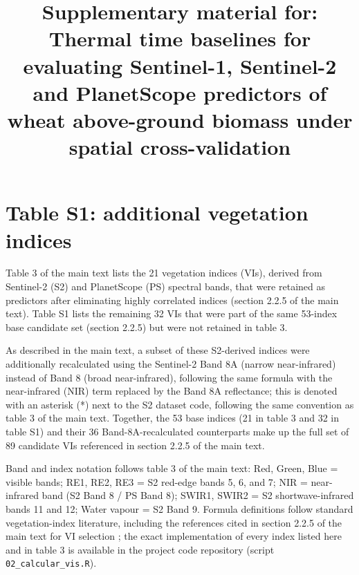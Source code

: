 \documentclass[
  british,
  suppldata]{interact}
\author{}
\date{}
\begin{document}
\title{Supplementary material for: Thermal time baselines for evaluating Sentinel-1, Sentinel-2 and PlanetScope predictors of wheat above-ground biomass under spatial cross-validation}
\author{
}
\maketitle


\section{Table S1: additional vegetation
indices}\label{table-s1-additional-vegetation-indices}

Table 3 of the main text lists the 21 vegetation indices (VIs), derived
from Sentinel-2 (S2) and PlanetScope (PS) spectral bands, that were
retained as predictors after eliminating highly correlated indices
(section 2.2.5 of the main text). Table S1 lists the remaining 32 VIs
that were part of the same 53-index base candidate set (section 2.2.5)
but were not retained in table 3.

As described in the main text, a subset of these S2-derived indices were
additionally recalculated using the Sentinel-2 Band 8A (narrow
near-infrared) instead of Band 8 (broad near-infrared), following the
same formula with the near-infrared (NIR) term replaced by the Band 8A
reflectance; this is denoted with an asterisk (*) next to the S2 dataset
code, following the same convention as table 3 of the main text.
Together, the 53 base indices (21 in table 3 and 32 in table S1) and
their 36 Band-8A-recalculated counterparts make up the full set of 89
candidate VIs referenced in section 2.2.5 of the main text.

Band and index notation follows table 3 of the main text: Red, Green,
Blue = visible bands; RE1, RE2, RE3 = S2 red-edge bands 5, 6, and 7; NIR
= near-infrared band (S2 Band 8 / PS Band 8); SWIR1, SWIR2 = S2
shortwave-infrared bands 11 and 12; Water vapour = S2 Band 9. Formula
definitions follow standard vegetation-index literature, including the
references cited in section 2.2.5 of the main text for VI selection
\citep{Peng2023, Segarra2022, Uribeetxebarria2023, Wang2022, Wu2008, Zheng2017};
the exact implementation of every index listed here and in table 3 is
available in the project code repository (script
\texttt{02\_calcular\_vis.R}).
\end{document}
